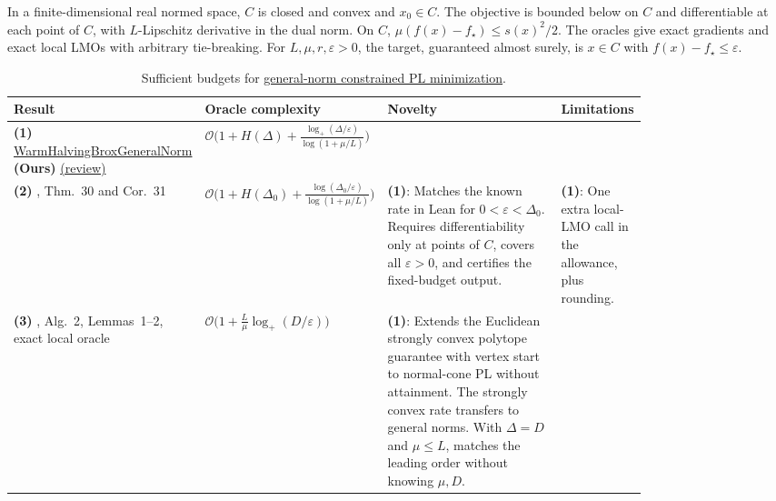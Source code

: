 \begin{table}[tp]
\centering
\caption{Sufficient budgets for \href{https://github.com/k3nfalt/longtails/blob/main/LongTails/Setups/BroxGeneralNormConstrainedPL.lean}{general-norm constrained PL minimization}.}\label{tab:BroxGeneralNormConstrainedPL}
\parbox{\linewidth}{\footnotesize In a finite-dimensional real normed space, $C$ is closed and convex and $x_0\in C$. The objective is bounded below on $C$ and differentiable at each point of $C$, with $L$-Lipschitz derivative in the dual norm. On $C$, $\mu(f(x)-f_\star)\le s(x)^2/2$. The oracles give exact gradients and exact local LMOs with arbitrary tie-breaking. For $L,\mu,r,\varepsilon>0$, the target, guaranteed almost surely, is $x\in C$ with $f(x)-f_\star\le\varepsilon$.}\par\smallskip
\begin{threeparttable}
\footnotesize
\setlength{\tabcolsep}{4pt}\renewcommand{\arraystretch}{1.25}
\begin{tabularx}{\linewidth}{@{}>{\raggedright\arraybackslash}p{0.20\linewidth}>{\raggedright\arraybackslash}p{0.29\linewidth}>{\raggedright\arraybackslash}p{0.32\linewidth}>{\raggedright\arraybackslash}X@{}}
\toprule
\textbf{Result} & \textbf{Oracle complexity} & \textbf{Novelty} & \textbf{Limitations} \\
\midrule
\textbf{(1)} \href{https://github.com/k3nfalt/longtails/blob/main/LongTails/Theorems/WarmHalvingBroxGeneralNorm.lean}{Warm\allowbreak{}Halving\allowbreak{}Brox\allowbreak{}General\allowbreak{}Norm} \textbf{(Ours)} \href{https://github.com/k3nfalt/longtails/blob/main/scripts/reviews/WarmHalvingBroxGeneralNorm.md}{(review)}
& $\mathcal{O}\bigl(1+H(\Delta)+\frac{\log_+(\Delta/\varepsilon)}{\log(1+\mu/L)}\bigr)$ & & \\
\midrule[1.2pt]
\textbf{(2)} \citep{rqGeneralNormBrox2026v1}, Thm.~30 and Cor.~31
& $\mathcal{O}\bigl(1+H(\Delta_0)+\frac{\log(\Delta_0/\varepsilon)}{\log(1+\mu/L)}\bigr)$
& \textbf{(1)}: Matches the known rate in Lean for $0<\varepsilon<\Delta_0$. Requires differentiability only at points of $C$, covers all $\varepsilon>0$, and certifies the fixed-budget output.
& \textbf{(1)}: One extra local-LMO call in the allowance, plus rounding. \\
\midrule
\textbf{(3)} \citep{garberHazanLocalOracle2015v6}, Alg.~2, Lemmas~1--2, exact local oracle
& $\mathcal{O}\bigl(1+\frac L\mu\log_+(D/\varepsilon)\bigr)$
& \textbf{(1)}: Extends the Euclidean strongly convex polytope guarantee with vertex start to normal-cone PL without attainment. The strongly convex rate transfers to general norms. With $\Delta=D$ and $\mu\le L$, matches the leading order without knowing $\mu,D$.

\end{tabularx}
\end{threeparttable}
\end{table}
